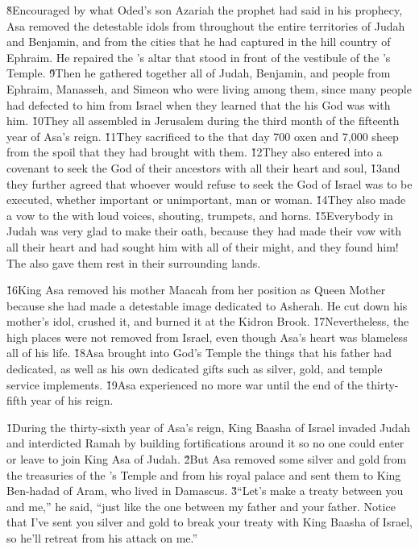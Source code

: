 \v{8}Encouraged by what Oded's son Azariah the prophet had said in his prophecy, Asa removed the detestable idols from throughout the entire territories of Judah and Benjamin, and from the cities that he had captured in the hill country of Ephraim. He repaired the 's altar that stood in front of the vestibule of the 's Temple. \v{9}Then he gathered together all of Judah, Benjamin, and people from Ephraim, Manasseh, and Simeon who were living among them, since many people had defected to him from Israel when they learned that the  his God was with him. \v{10}They all assembled in Jerusalem during the third month of the fifteenth year of Asa's reign. \v{11}They sacrificed to the  that day 700 oxen and 7,000 sheep from the spoil that they had brought with them. \v{12}They also entered into a covenant to seek the  God of their ancestors with all their heart and soul, \v{13}and they further agreed that whoever would refuse to seek the  God of Israel was to be executed, whether important or unimportant, man or woman. \v{14}They also made a vow to the  with loud voices, shouting, trumpets, and horns. \v{15}Everybody in Judah was very glad to make their oath, because they had made their vow with all their heart and had sought him with all of their might, and they found him! The  also gave them rest in their surrounding lands.

\v{16}King Asa removed his mother Maacah from her position as Queen Mother because she had made a detestable image dedicated to Asherah. He cut down his mother's idol, crushed it, and burned it at the Kidron Brook. \v{17}Nevertheless, the high places were not removed from Israel, even though Asa's heart was blameless all of his life. \v{18}Asa brought into God's Temple the things that his father had dedicated, as well as his own dedicated gifts such as silver, gold, and temple service implements. \v{19}Asa experienced no more war until the end of the thirty-fifth year of his reign.

\v{1}During the thirty-sixth year of Asa's reign, King Baasha of Israel invaded Judah and interdicted Ramah by building fortifications around it so no one could enter or leave to join King Asa of Judah. \v{2}But Asa removed some silver and gold from the treasuries of the 's Temple and from his royal palace and sent them to King Ben-hadad of Aram, who lived in Damascus. \v{3}``Let's make a treaty between you and me,'' he said, ``just like the one between my father and your father. Notice that I've sent you silver and gold to break your treaty with King Baasha of Israel, so he'll retreat from his attack on me.''

